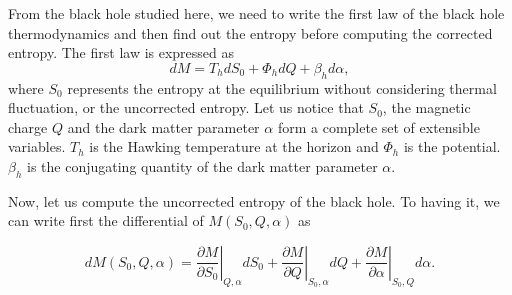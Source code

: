 \documentclass[10pt,letterpaper]{article}
\begin{document}
%


From the black hole studied here, we need to write the first law of the black hole thermodynamics and then find out the entropy before computing the corrected entropy. The first law is expressed as\cite{nam2018on}
\begin{equation}\label{first_law3}
dM = T_{h}dS_0+\Phi_{h} dQ + \beta_{h}d\alpha,
\end{equation}
where $S_0$ represents the entropy at the equilibrium without considering thermal fluctuation, or the uncorrected entropy. Let us notice that $S_0$, the magnetic charge $Q$ and the dark matter parameter $\alpha$ form a complete set of extensible variables. $T_h$ is the Hawking temperature at the horizon and $\Phi_h$ is the potential. $\beta_h$ is the conjugating quantity of the dark matter parameter $\alpha$. 

Now, let us compute the uncorrected entropy of the black hole. To having it, we can write first the differential of $M(S_0,Q,\alpha)$ as

\begin{equation}\label{derivMa1}
dM(S_0,Q,\alpha)=\left.\frac{\partial M}{\partial S_0}\right|_{Q,\alpha}dS_0+\left.\frac{\partial M}{\partial Q}\right|_{S_0,\alpha}dQ+\left.\frac{\partial M}{\partial \alpha}\right|_{S_0,Q}d\alpha.
\end{equation}
\end{document}
